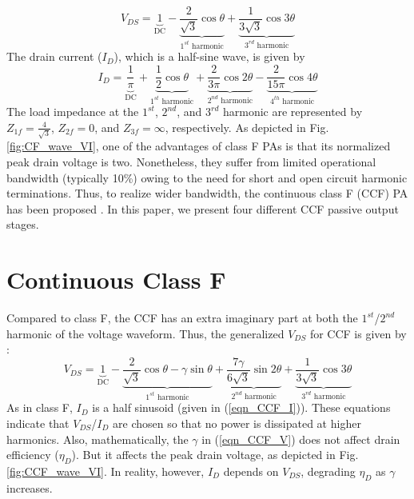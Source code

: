 \documentclass[conference]{IEEEtran}
\begin{document}
\begin{equation}
V_{DS}=\underbrace{1}_{\text{DC}}-\underbrace{\frac{2}{\sqrt{3}} \cos \theta}_{\text{$1^{st}$ harmonic}}+\underbrace{\frac{1}{3 \sqrt{3}} \cos 3 \theta}_{\text{$3^{rd}$ harmonic}}
\label{eqn_CF_V}
\end{equation}
The drain current ($I_{D}$), which is a half-sine wave, is given by
\begin{equation}
I_{D}=\underbrace{\frac{1}{\pi}}_{\text{DC}}+\underbrace{\frac{1}{2} \cos \theta}_{\text{$1^{st}$ harmonic}}+\underbrace{\frac{2}{3 \pi} \cos 2 \theta}_{\text{$2^{nd}$ harmonic}}-\underbrace{\frac{2}{15 \pi} \cos 4 \theta}_{\text{$4^{th}$ harmonic}}
\label{eqn_CCF_I}
\end{equation}
The load impedance at the  $1^{st}$, $2^{nd}$, and $3^{rd}$ harmonic are represented by $Z_{1f}=\frac{4}{\sqrt{3}}$, $Z_{2f}=0$, and $Z_{3f}=\infty$, respectively. As depicted in Fig. \ref{fig:CF_wave_VI},  one of the advantages of class F PAs is that its normalized peak drain voltage is two. Nonetheless, they suffer from limited operational bandwidth (typically 10\%) owing to the need for short and open circuit harmonic terminations. Thus, to realize wider bandwidth, the continuous class F (CCF) PA has been proposed \cite{CCF_reason}. In this paper, we present four different CCF passive output stages. 

\section{Continuous Class F}
\label{section:CCF}
\vspace{-0.05in}
Compared to class F, the CCF has an extra imaginary part at both the $1^{st}$/$2^{nd}$ harmonic of the voltage waveform. Thus, the generalized $V_{DS}$ for CCF is given by \cite{ECCF_Carrubba}:
\begin{equation}
V_{DS}=\underbrace{1}_{\text{DC}}-\underbrace{\frac{2}{\sqrt{3}} \cos \theta-\gamma \sin \theta}_{\text{$1^{st}$ harmonic}}+\underbrace{\frac{7 \gamma}{6 \sqrt{3}} \sin 2 \theta}_{\text{$2^{nd}$ harmonic}}+\underbrace{\frac{1}{3 \sqrt{3}} \cos 3 \theta}_{\text{$3^{rd}$ harmonic}}
\label{eqn_CCF_V}
\end{equation}
As in class F, $I_{D}$ is a half sinusoid (given in (\ref{eqn_CCF_I})). These equations indicate that $V_{DS}$/$I_{D}$ are chosen so that no power is dissipated at higher harmonics. Also, mathematically, the $\gamma$ in (\ref{eqn_CCF_V}) does not affect drain efficiency ($\eta_D$). But it affects the peak drain voltage, as depicted in Fig. \ref{fig:CCF_wave_VI}. In reality, however, $I_{D}$ depends on $V_{DS}$, degrading $\eta_D$ as $\gamma$ increases.
\end{document}
